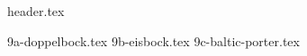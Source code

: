 \clearpage
{}
\divisorLine
{header.tex}
\begin{multicols*}{2}
{9a-doppelbock.tex}
{9b-eisbock.tex}
{9c-baltic-porter.tex}
\end{multicols*}